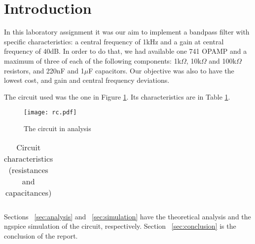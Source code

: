 \section{Introduction}
\label {sec:introduction}


In this laboratory assignment it was our aim to implement a bandpass filter with specific characteristics: a central frequency of 1kHz and a gain at central frequency of 40dB. In order to do that, we had available one 741 OPAMP and a maximum of three of each of the following components: 1k$\Omega$, 10k$\Omega$ and 100k$\Omega$ resistors, and 220nF and 1$\mu$F capacitors. Our objective was also to have the lowest cost, and gain and central frequency deviations.

The circuit used was the one in Figure \ref{fig:circuit}. Its characteristics are in Table \ref{tab:circuit}.


\begin{figure}[H] \centering
\texttt{[image: rc.pdf]}
\caption{The circuit in analysis}
\label{fig:circuit}
\end{figure}


\begin{table}[H]
  \centering
  \begin{tabular}{|c|c|}
    \hline
      
  \end{tabular}
  \caption{Circuit characteristics (resistances and capacitances)}
  \label{tab:circuit}
\end{table}


%      

Sections ~\ref{sec:analysis} and ~\ref{sec:simulation} have the theoretical analysis and the ngspice simulation of the circuit, respectively. Section ~\ref{sec:conclusion} is the conclusion of the report.
